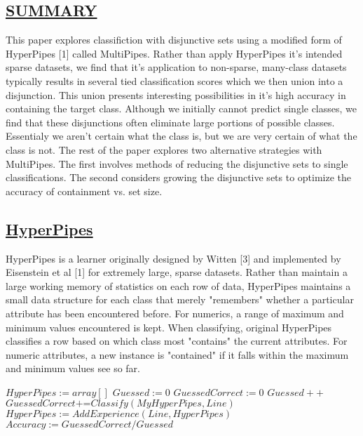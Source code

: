 \begin{kasten}
    \section*{ \hspace{0.1cm} {\color{red} \underline{SUMMARY}}}
    \Large{

\hspace{6mm}This paper explores classifiction with disjunctive sets using a modified form of HyperPipes [1] called MultiPipes. Rather than apply HyperPipes it's intended sparse datasets, we find that it's application to non-sparse, many-class datasets typically results in several tied classification scores which we then union into a disjunction. This union presents interesting possibilities in it's high accuracy in containing the target class. Although we initially cannot predict single classes, we find that these disjunctions often eliminate large portions of possible classes. Essentialy we aren't certain what the class is, but we are very certain of what the class is not. The rest of the paper explores two alternative strategies with MultiPipes. The first involves methods of reducing the disjunctive sets to single classifications. The second considers growing the disjunctive sets to optimize the accuracy of containment vs. set size.
    }
\end{kasten}

\begin{kasten}
  \section*{ \hspace{0.1cm} {\color{red} \underline{HyperPipes}}}
\large{
HyperPipes is a learner originally designed by Witten [3] and implemented by Eisenstein et al [1] for extremely large, sparse datasets. Rather than maintain a large working memory of statistics on each row of data, HyperPipes maintains a small data structure for each class that merely "remembers" whether a particular attribute has been encountered before. For numerics, a range of maximum and minimum values encountered is kept. When classifying, original HyperPipes classifies a row based on which class most "contains" the current attributes. For numeric attributes, a new instance is "contained" if it falls within the maximum and minimum values see so far.
\vspace{3 mm}
\begin{algorithmic}
\State $HyperPipes := array[]$
\State $Guessed := 0$
\State $GuessedCorrect := 0$
\State $Guessed++$
\State $GuessedCorrect \mbox{+=} Classify(MyHyperPipes,Line)$
\State $HyperPipes := AddExperience(Line,HyperPipes)$
\EndFor
\State $Accuracy := GuessedCorrect/Guessed$
\EndProcedure
\end{algorithmic}
}
\end{kasten}

